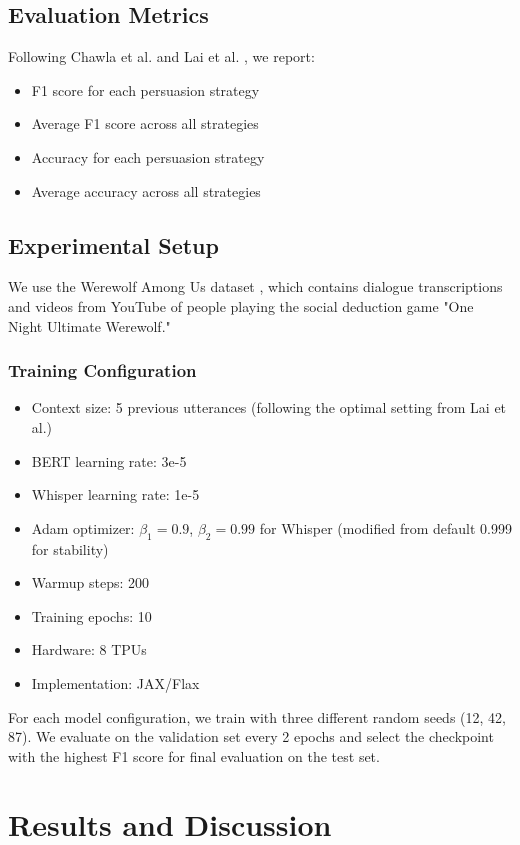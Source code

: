 \documentclass{article}
\begin{document}
\subsection{Evaluation Metrics}
Following Chawla et al. \cite{chawla2021casino} and Lai et al. \cite{lai2022werewolf}, we report:
\begin{itemize}
    \item F1 score for each persuasion strategy
    \item Average F1 score across all strategies
    \item Accuracy for each persuasion strategy
    \item Average accuracy across all strategies
\end{itemize}

\subsection{Experimental Setup}
We use the Werewolf Among Us dataset \cite{lai2022werewolf}, which contains dialogue transcriptions and videos from YouTube of people playing the social deduction game "One Night Ultimate Werewolf." 

\subsubsection{Training Configuration}
\begin{itemize}
    \item Context size: 5 previous utterances (following the optimal setting from Lai et al.)
    \item BERT learning rate: 3e-5
    \item Whisper learning rate: 1e-5
    \item Adam optimizer: $\beta_1=0.9$, $\beta_2=0.99$ for Whisper (modified from default 0.999 for stability)
    \item Warmup steps: 200
    \item Training epochs: 10
    \item Hardware: 8 TPUs
    \item Implementation: JAX/Flax
\end{itemize}

For each model configuration, we train with three different random seeds (12, 42, 87). We evaluate on the validation set every 2 epochs and select the checkpoint with the highest F1 score for final evaluation on the test set.

\section{Results and Discussion}
\end{document}
